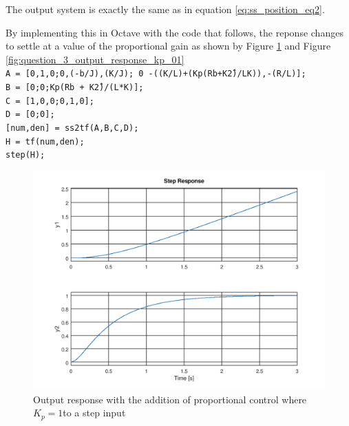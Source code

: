 \documentclass[a4paper, 12pt]{article}
\begin{document}
The output system is exactly the same as in equation \eqref{eq:ss_position_eq2}.

By implementing this in Octave with the code that follows, the reponse changes to settle at a value of the proportional gain as shown by Figure \ref{fig:question_3_output_response_kp_1} and Figure \ref{fig:question_3_output_response_kp_01}\\
\noindent
\texttt{A = [0,1,0;0,(-b/J),(K/J); 0 -((K/L)+(Kp\*(R\*b+K\^2)/L\*K)),-(R/L)];}\\
\texttt{B = [0;0;Kp\*(R\*b + K\^2)/(L*K)];}\\
\texttt{C = [1,0,0;0,1,0];}\\
\texttt{D = [0;0];}\\
\texttt{[num,den] = ss2tf(A,B,C,D);}\\
\texttt{H = tf(num,den);}\\
\texttt{step(H);}\\

\begin{figure}[H]
	\centering
	\includegraphics[width=\textwidth]{Images/question_3_output_response_kp_1.png}
	\caption{Output response with the addition of proportional control where $K_p = 1$to a step input}
	\label{fig:question_3_output_response_kp_1}
\end{figure}
\end{document}
